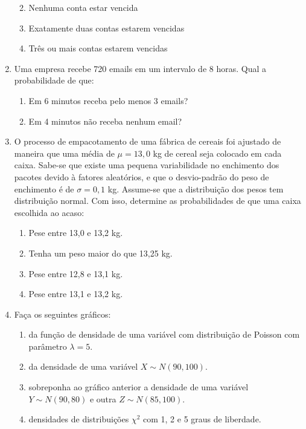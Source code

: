\documentclass[10pt,a4paper]{book}
\providecommand{\tightlist}{%
  \setlength{\itemsep}{0pt}\setlength{\parskip}{0pt}}
\begin{document}
\begin{enumerate}
  \begin{enumerate}
  \def\labelenumii{\alph{enumii}.}
  \tightlist
  \item
    Nenhuma conta estar vencida
  \item
    Exatamente duas contas estarem vencidas
  \item
    Três ou mais contas estarem vencidas
  \end{enumerate}
\item
  Uma empresa recebe 720 emails em um intervalo de 8 horas. Qual a
  probabilidade de que:

  \begin{enumerate}
  \def\labelenumii{\alph{enumii}.}
  \tightlist
  \item
    Em 6 minutos receba pelo menos 3 emails?
  \item
    Em 4 minutos não receba nenhum email?
  \end{enumerate}
\item
  O processo de empacotamento de uma fábrica de cereais foi ajustado de
  maneira que uma média de \(\mu = 13,0\) kg de cereal seja colocado em
  cada caixa. Sabe-se que existe uma pequena variabilidade no enchimento
  dos pacotes devido à fatores aleatórios, e que o desvio-padrão do peso
  de enchimento é de \(\sigma = 0,1\) kg. Assume-se que a distribuição
  dos pesos tem distribuição normal. Com isso, determine as
  probabilidades de que uma caixa escolhida ao acaso:

  \begin{enumerate}
  \def\labelenumii{\alph{enumii}.}
  \tightlist
  \item
    Pese entre 13,0 e 13,2 kg.
  \item
    Tenha um peso maior do que 13,25 kg.
  \item
    Pese entre 12,8 e 13,1 kg.
  \item
    Pese entre 13,1 e 13,2 kg.
  \end{enumerate}
\item
  Faça os seguintes gráficos:

  \begin{enumerate}
  \def\labelenumii{\alph{enumii}.}
  \tightlist
  \item
    da função de densidade de uma variável com distribuição de Poisson
    com parâmetro \(\lambda = 5\).
  \item
    da densidade de uma variável \(X \sim N(90, 100)\).
  \item
    sobreponha ao gráfico anterior a densidade de uma variável
    \(Y \sim N(90, 80)\) e outra \(Z \sim N(85, 100)\).
  \item
    densidades de distribuições \(\chi^2\) com 1, 2 e 5 graus de
    liberdade.
  \end{enumerate}
\end{enumerate}
\end{document}
